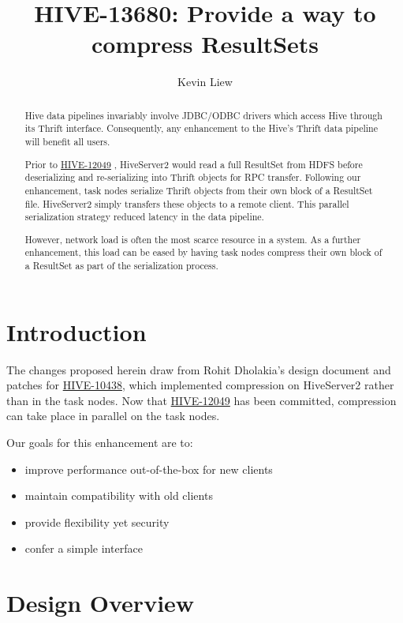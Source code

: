 \documentclass[11pt,a4paper]{article}
\title{HIVE-13680: Provide a way to compress ResultSets}
\author{Kevin Liew}
\begin{document}
\maketitle

\begin{abstract}
	Hive data pipelines invariably involve JDBC/ODBC drivers which access Hive through its Thrift interface. 
	Consequently, any enhancement to the Hive's Thrift data pipeline will benefit all users.
	
	Prior to 
	\href{https://issues.apache.org/jira/browse/HIVE-12049}{HIVE-12049}
	, HiveServer2 would read a full ResultSet from HDFS before deserializing and re-serializing into Thrift objects for RPC transfer.
	Following our enhancement, task nodes serialize Thrift objects from their own block of a ResultSet file. 
	HiveServer2 simply transfers these objects to a remote client. 
	This parallel serialization strategy reduced latency in the data pipeline.
	
	However, network load is often the most scarce resource in a system. 
	As a further enhancement, this load can be eased by having task nodes compress their own block of a ResultSet as part of the serialization process.
\end{abstract}

\section{Introduction}
	The changes proposed herein draw from Rohit Dholakia's design document and patches for
	\href{https://issues.apache.org/jira/browse/HIVE-10438}{HIVE-10438}, which implemented compression on HiveServer2 rather than in the task nodes.
	Now that
	\href{https://issues.apache.org/jira/browse/HIVE-12049}{HIVE-12049}
	has been committed, compression can take place in parallel on the task nodes.
	
	Our goals for this enhancement are to:
	\begin{itemize}
		\item improve performance out-of-the-box for new clients
		\item maintain compatibility with old clients
		\item provide flexibility yet security
		\item confer a simple interface
	\end{itemize}

\section{Design Overview}
\end{document}
